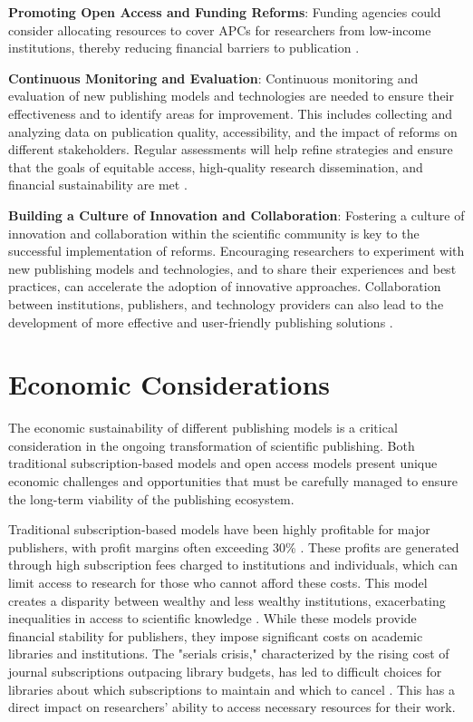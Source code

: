 \documentclass{article}
\begin{document}
\textbf{Promoting Open Access and Funding Reforms}: 
Funding agencies could consider allocating resources to cover APCs for researchers from low-income institutions, thereby reducing financial barriers to publication \cite{khoo2019apc}.

\textbf{Continuous Monitoring and Evaluation}: 
Continuous monitoring and evaluation of new publishing models and technologies are needed to ensure their effectiveness and to identify areas for improvement. This includes collecting and analyzing data on publication quality, accessibility, and the impact of reforms on different stakeholders. Regular assessments will help refine strategies and ensure that the goals of equitable access, high-quality research dissemination, and financial sustainability are met \cite{publons2018global}.

\textbf{Building a Culture of Innovation and Collaboration}: 
Fostering a culture of innovation and collaboration within the scientific community is key to the successful implementation of reforms. Encouraging researchers to experiment with new publishing models and technologies, and to share their experiences and best practices, can accelerate the adoption of innovative approaches. Collaboration between institutions, publishers, and technology providers can also lead to the development of more effective and user-friendly publishing solutions \cite{shearer2015fostering}.

\section{Economic Considerations}
The economic sustainability of different publishing models is a critical consideration in the ongoing transformation of scientific publishing. Both traditional subscription-based models and open access models present unique economic challenges and opportunities that must be carefully managed to ensure the long-term viability of the publishing ecosystem.

Traditional subscription-based models have been highly profitable for major publishers, with profit margins often exceeding 30\% \cite{buranyi2017profitable}. These profits are generated through high subscription fees charged to institutions and individuals, which can limit access to research for those who cannot afford these costs. This model creates a disparity between wealthy and less wealthy institutions, exacerbating inequalities in access to scientific knowledge \cite{lariviere2015oligopoly}. While these models provide financial stability for publishers, they impose significant costs on academic libraries and institutions. The "serials crisis," characterized by the rising cost of journal subscriptions outpacing library budgets, has led to difficult choices for libraries about which subscriptions to maintain and which to cancel \cite{khoo2019apc}. This has a direct impact on researchers' ability to access necessary resources for their work.
\end{document}
